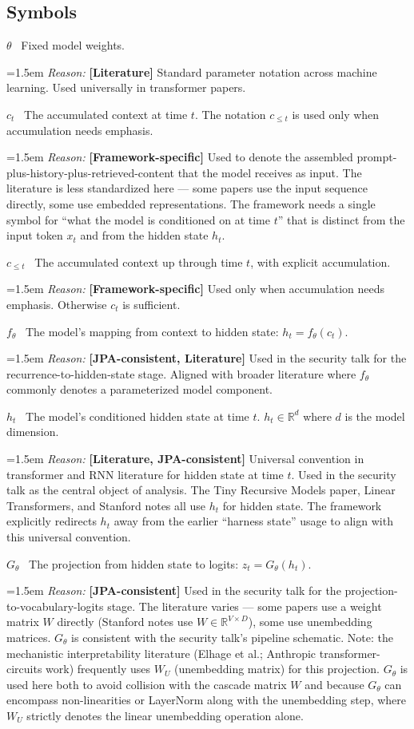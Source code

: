 \documentclass[11pt]{article}
\newcommand{\notation}[2]{%
  \par\smallskip
  \noindent\textbf{#1} \, #2\par
}
\newcommand{\reason}[2]{%
  \par\nopagebreak
  \begingroup
    \leftskip=1.5em
    \sloppy
    \noindent\textit{Reason:} \textbf{[#1]} #2\par
  \endgroup
  \par\smallskip
}
\begin{document}
\subsection*{Symbols}

\notation{$\theta$}{Fixed model weights.}
\reason{Literature}{Standard parameter notation across machine learning. Used universally in transformer papers.}

\notation{$c_t$}{The accumulated context at time $t$. The notation $c_{\le t}$ is used only when accumulation needs emphasis.}
\reason{Framework-specific}{Used to denote the assembled prompt-plus-history-plus-retrieved-content that the model receives as input. The literature is less standardized here --- some papers use the input sequence directly, some use embedded representations. The framework needs a single symbol for ``what the model is conditioned on at time $t$'' that is distinct from the input token $x_t$ and from the hidden state $h_t$.}

\notation{$c_{\le t}$}{The accumulated context up through time $t$, with explicit accumulation.}
\reason{Framework-specific}{Used only when accumulation needs emphasis. Otherwise $c_t$ is sufficient.}

\notation{$f_\theta$}{The model's mapping from context to hidden state: $h_t = f_\theta(c_t)$.}
\reason{JPA-consistent, Literature}{Used in the security talk for the recurrence-to-hidden-state stage. Aligned with broader literature where $f_\theta$ commonly denotes a parameterized model component.}

\notation{$h_t$}{The model's conditioned hidden state at time $t$. $h_t \in \mathbb{R}^d$ where $d$ is the model dimension.}
\reason{Literature, JPA-consistent}{Universal convention in transformer and RNN literature for hidden state at time $t$. Used in the security talk as the central object of analysis. The Tiny Recursive Models paper, Linear Transformers, and Stanford notes all use $h_t$ for hidden state. The framework explicitly redirects $h_t$ away from the earlier ``harness state'' usage to align with this universal convention.}

\notation{$G_\theta$}{The projection from hidden state to logits: $z_t = G_\theta(h_t)$.}
\reason{JPA-consistent}{Used in the security talk for the projection-to-vocabulary-logits stage. The literature varies --- some papers use a weight matrix $W$ directly (Stanford notes use $W \in \mathbb{R}^{V \times D}$), some use unembedding matrices. $G_\theta$ is consistent with the security talk's pipeline schematic. Note: the mechanistic interpretability literature (Elhage et al.; Anthropic transformer-circuits work) frequently uses $W_U$ (unembedding matrix) for this projection. $G_\theta$ is used here both to avoid collision with the cascade matrix $W$ and because $G_\theta$ can encompass non-linearities or LayerNorm along with the unembedding step, where $W_U$ strictly denotes the linear unembedding operation alone.}
\end{document}
